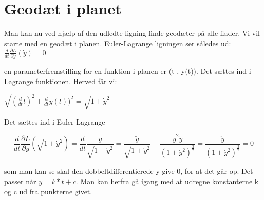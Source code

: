 \section{Geodæt i planet}
Man kan nu ved hjælp af den udledte ligning finde geodæter på alle flader. Vi vil starte med en geodæt i planen. Euler-Lagrange ligningen ser således ud:
$\frac{d}{dt} \frac{\partial L}{\partial \dot{y}}(\dot{y})=0$

en parameterfremstilling for en funktion i planen er (t , y(t)). Det sættes ind i Lagrange funktionen. Herved får vi:

$\sqrt{(\frac{d}{dt}t)^2+\frac{d}{dt}y(t))^2}=\sqrt{1+\dot{y}^2}$

Det sættes ind i Euler-Lagrange
 
\begin{equation}
\frac{d}{dt} \frac{\partial L}{\partial \dot{y}}(\sqrt{1+\dot{y}^2})=\frac{d}{dt} \frac{\dot{y}}{\sqrt{1+\dot{y}^2}} = \frac{\ddot{y}}{\sqrt{1+\dot{y}^2}}-\frac{\dot{y}^2\ddot{y}}{(1+\dot{y}^2)^\frac{3}{2}}=\frac{\ddot{y}}{(1+\dot{y}^2)^\frac{3}{2}}=0
\end{equation}

som man kan se skal den dobbeltdifferentierede y give 0, for at det går op. Det passer når $y=k*t+c$. Man kan herfra gå igang med at udregne konstanterne k og c ud fra punkterne givet.